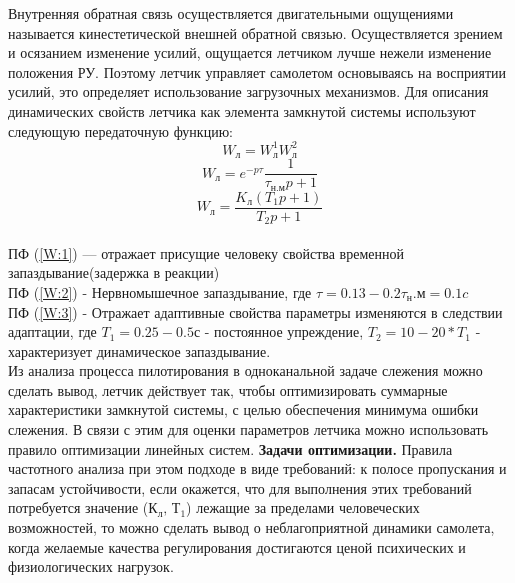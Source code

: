 \documentclass{article}
\begin{document}
Внутренняя обратная связь осуществляется двигательными ощущениями называется кинестетической внешней обратной связью. Осуществляется зрением и осязанием изменение усилий, ощущается летчиком лучше нежели изменение положения РУ. Поэтому летчик управляет самолетом основываясь на восприятии усилий, это определяет использование загрузочных механизмов. Для описания динамических свойств летчика как элемента замкнутой системы используют следующую передаточную функцию:
\begin{equation} \label{W:1}
W_л = W_л^1 W_л^2 
\end{equation}
\begin{equation} \label{W:2}
 W_л = e^{-p\tau} \frac{1}{\tau_{н.м} p +1} 
\end{equation}
\begin{equation} \label{W:3}
 W_л = \frac{K_л(T_1 p + 1)}{T_2 p +1}
\end{equation}\\
ПФ (\ref{W:1}) --- отражает присущие человеку свойства временной запаздывание(задержка в реакции)\\
ПФ (\ref{W:2}) - Нервномышечное запаздывание, где $\tau = 0.13 - 0.2 \tau_н.м= 0.1c$ \\
ПФ (\ref{W:3}) - Отражает адаптивные свойства параметры изменяются в следствии адаптации, где $T_1 = 0.25 - 0.5 с$ - постоянное упреждение, $T_2 = 10 - 20 * T_1$ - характеризует динамическое запаздывание.\\
Из анализа процесса пилотирования в одноканальной задаче слежения можно сделать вывод, летчик действует так, чтобы оптимизировать суммарные характеристики замкнутой системы, с целью обеспечения минимума ошибки слежения. В связи с этим для оценки параметров летчика можно использовать правило оптимизации линейных систем.
\textbf{Задачи оптимизации.} Правила частотного анализа при этом подходе в виде требований: к полосе пропускания и запасам устойчивости, если окажется, что для выполнения этих требований потребуется значение ($К_л, \, Т_1$) лежащие за пределами человеческих возможностей, то можно сделать вывод о неблагоприятной динамики самолета, когда желаемые качества регулирования достигаются ценой психических и физиологических нагрузок.
\end{document}
